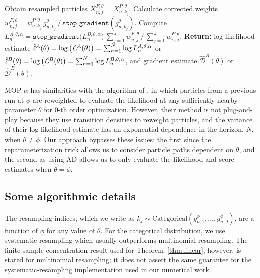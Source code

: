 \documentclass[numsec,webpdf,modern,medium,namedate]{oup-authoring-template}
\begin{document}
\begin{algorithm}[htbp!]
            \hspace*{4mm} Obtain resampled particles ${X}_{n,j}^{F,\theta}={X}_{n,k_{j}}^{P,\theta}$. \newline
            \hspace*{4mm} Calculate corrected weights
            $w_{n,j}^{F,\theta}= w^{P,\theta}_{n,k_j} \, g^{\theta}_{n,k_j} \, \big/ \, { \mathtt{stop\_gradient}(g^{\theta}_{n,k_j})}$.\newline
            \hspace*{4mm} Compute $ L_n^{A,\theta,\alpha} = \mathtt{stop\_gradient}\big(L_n^{B,\theta,\alpha}\big)\, {\sum_{j=1}^J w^{F,\theta}_{n,j}} \, \big/ \, {\sum_{j=1}^J  w^{P,\theta}_{n,j}}$.\newline
	    \textbf{Return:} log-likelihood estimate $\hat{\ell}^A(\theta)= \log\big(\hat{\mathcal{L}}^A(\theta)\big) = \sum_{n=1}^N \log L_n^{A,\theta,\alpha}$ or $\hat{\ell}^B(\theta)=\log\big(\hat{\mathcal{L}}^B(\theta)\big) = \sum_{n=1}^N \log L_n^{B,\theta,\alpha}$, and gradient estimate $\hat{\mathcal{D}}^A(\theta)$ or $\hat{\mathcal{D}}^B(\theta)$.
\end{algorithm}

MOP-$\alpha$ has similarities with the algorithm of \cite{svensson18}, in which particles from a previous run at $\phi$ are reweighted to evaluate the likelihood at any sufficiently nearby parameter $\theta$ for $0$-th order optimization.
However, their method is not plug-and-play because they use transition densities to reweight particles, and the variance of their log-likelihood estimate has an exponential dependence in the horizon, $N$, when $\theta\neq\phi$.
Our approach bypasses these issues: the first since the reparameterization trick allows us to consider particle paths dependent on $\theta$, and the second as using AD allows us to only evaluate the likelihood and score estimates when $\theta=\phi$. 

\subsection{Some algorithmic details}

The resampling indices, which we write as $k_j \sim \text{Categorical}(g^{\phi}_{n,1},...,g^{\phi}_{n,J})$, are a function of $\phi$ for any value of $\theta$.
For the categorical distribution, we use systematic resampling \citep{arulampalam02,king16} which usually outperforms multinomial resampling.
The finite-sample concentration result used for Theorem~\ref{thm:linear},
however, is stated for multinomial resampling; it does not assert the same
guarantee for the systematic-resampling implementation used in our numerical
work.
\end{document}
